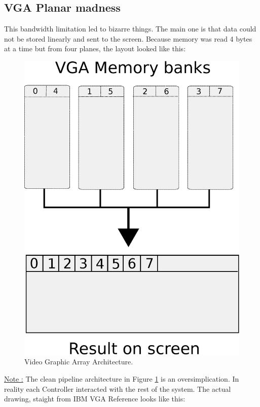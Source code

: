 \documentclass[book.tex]{subfiles}
\begin{document}
\subsection{VGA Planar madness}

This bandwidth limitation led to bizarre things. The main one is that data could not be stored linearly and sent to the screen. Because memory was read 4 bytes at a time but from four planes, the layout looked like this:\\

\begin{figure}[H]
\centering
\includegraphics[scale=0.5]{imgs/vga_ram_screen_layout.eps}
\caption{Video Graphic Array Architecture.}
\label{fig:vga_arch}
\end{figure}

 {\underline{Note :}} The clean pipeline architecture in Figure \ref{fig:vga_arch} is an oversimplication. In reality each Controller interacted with the rest of the system. The actual drawing, staight from IBM VGA Reference looks like this:\\
 
\end{document}
